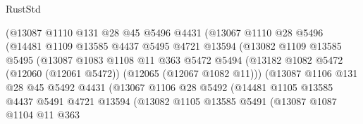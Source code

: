 \begin{lexlean}{RustStd}
\begin{coremodule}
                          (@13087
                            @1110
                            @131
                            @28
                            @45
                            @5496
                            @4431
                            (@13067
                              @1110
                              @28
                              @5496
                              (@14481
                                @1109
                                @13585
                                @4437
                                @5495
                                @4721
                                @13594
                                (@13082
                                  @1109
                                  @13585
                                  @5495
                                  (@13087
                                    @1083
                                    @1108
                                    @11
                                    @363
                                    @5472
                                    @5494
                                    (@13182
                                      @1082
                                      @5472
                                      (@12060 (@12061 @5472))
                                      (@12065 (@12067 @1082 @11)))
                                    (@13087
                                      @1106
                                      @131
                                      @28
                                      @45
                                      @5492
                                      @4431
                                      (@13067
                                        @1106
                                        @28
                                        @5492
                                        (@14481
                                          @1105
                                          @13585
                                          @4437
                                          @5491
                                          @4721
                                          @13594
                                          (@13082
                                            @1105
                                            @13585
                                            @5491
                                            (@13087
                                              @1087
                                              @1104
                                              @11
                                              @363

\end{coremodule}
\end{lexlean}
